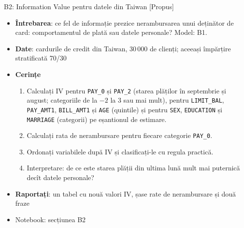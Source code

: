\begin{frame}{B2: Information Value pentru datele din Taiwan [Propus]}
\itemsize{\footnotesize}
\begin{itemize}
\item \textbf{Întrebarea}: ce fel de informație prezice nerambursarea unui deținător de card: comportamentul de plată sau datele personale? Model: B1.
\item \textbf{Date}: cardurile de credit din Taiwan, 30\,000 de clienți; aceeași împărțire stratificată 70/30
\item \textbf{Cerințe}
\begin{enumerate}
    \item Calculați IV pentru \texttt{PAY\_0} și \texttt{PAY\_2} (starea plăților în septembrie și august; categoriile de la $-2$ la 3 sau mai mult), pentru \texttt{LIMIT\_BAL}, \texttt{PAY\_AMT1}, \texttt{BILL\_AMT1} și \texttt{AGE} (quintile) și pentru \texttt{SEX}, \texttt{EDUCATION} și \texttt{MARRIAGE} (categorii) pe eșantionul de estimare.
    \item Calculați rata de nerambursare pentru fiecare categorie \texttt{PAY\_0}.
    \item Ordonați variabilele după IV și clasificați-le cu regula practică.
    \item Interpretare: de ce este starea plății din ultima lună mult mai puternică decît datele personale?
\end{enumerate}
\item \textbf{Raportați}: un tabel cu nouă valori IV, șase rate de nerambursare și două fraze
\item Notebook: secțiunea B2
\end{itemize}
\end{frame}

